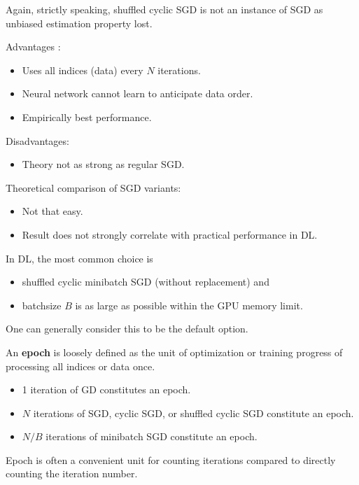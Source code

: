\begin{concept}
    Again, strictly speaking, shuffled cyclic SGD is not an instance of SGD as unbiased estimation property lost.

    Advantages :

    \begin{itemize}
        \item Uses all indices (data) every $N$ iterations.
        \item Neural network cannot learn to anticipate data order.
        \item Empirically best performance.
    \end{itemize}

    Disadvantages:

    \begin{itemize}
        \item Theory not as strong as regular SGD.
    \end{itemize}
\end{concept}

\begin{concept}
    Theoretical comparison of SGD variants:

    \begin{itemize}
        \item Not that easy.
        \item Result does not strongly correlate with practical performance in DL.
    \end{itemize}

    In DL, the most common choice is

    \begin{itemize}
        \item shuffled cyclic minibatch SGD (without replacement) and
        \item batchsize $B$ is as large as possible within the GPU memory limit.
    \end{itemize}

    One can generally consider this to be the default option.
\end{concept}

\begin{definition}
    An \textbf{epoch} is loosely defined as the unit of optimization or training progress of processing all indices or data once.

    \begin{itemize}
        \item 1 iteration of GD constitutes an epoch.
        \item $N$ iterations of SGD, cyclic SGD, or shuffled cyclic SGD constitute an epoch.
        \item $N / B$ iterations of minibatch SGD constitute an epoch.
    \end{itemize}

    Epoch is often a convenient unit for counting iterations compared to directly counting the iteration number.
\end{definition}

